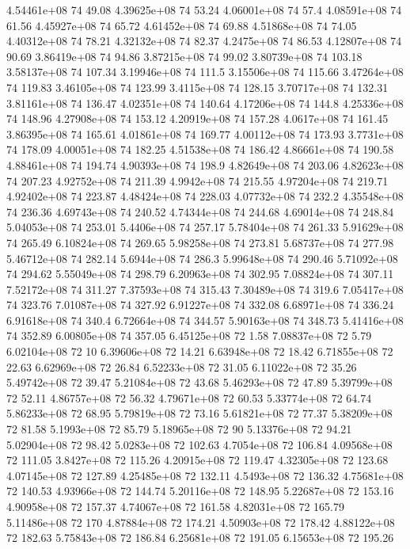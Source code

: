 4.54461e+08 74 49.08
4.39625e+08 74 53.24
4.06001e+08 74 57.4
4.08591e+08 74 61.56
4.45927e+08 74 65.72
4.61452e+08 74 69.88
4.51868e+08 74 74.05
4.40312e+08 74 78.21
4.32132e+08 74 82.37
4.2475e+08 74 86.53
4.12807e+08 74 90.69
3.86419e+08 74 94.86
3.87215e+08 74 99.02
3.80739e+08 74 103.18
3.58137e+08 74 107.34
3.19946e+08 74 111.5
3.15506e+08 74 115.66
3.47264e+08 74 119.83
3.46105e+08 74 123.99
3.4115e+08 74 128.15
3.70717e+08 74 132.31
3.81161e+08 74 136.47
4.02351e+08 74 140.64
4.17206e+08 74 144.8
4.25336e+08 74 148.96
4.27908e+08 74 153.12
4.20919e+08 74 157.28
4.0617e+08 74 161.45
3.86395e+08 74 165.61
4.01861e+08 74 169.77
4.00112e+08 74 173.93
3.7731e+08 74 178.09
4.00051e+08 74 182.25
4.51538e+08 74 186.42
4.86661e+08 74 190.58
4.88461e+08 74 194.74
4.90393e+08 74 198.9
4.82649e+08 74 203.06
4.82623e+08 74 207.23
4.92752e+08 74 211.39
4.9942e+08 74 215.55
4.97204e+08 74 219.71
4.92402e+08 74 223.87
4.48424e+08 74 228.03
4.07732e+08 74 232.2
4.35548e+08 74 236.36
4.69743e+08 74 240.52
4.74344e+08 74 244.68
4.69014e+08 74 248.84
5.04053e+08 74 253.01
5.4406e+08 74 257.17
5.78404e+08 74 261.33
5.91629e+08 74 265.49
6.10824e+08 74 269.65
5.98258e+08 74 273.81
5.68737e+08 74 277.98
5.46712e+08 74 282.14
5.6944e+08 74 286.3
5.99648e+08 74 290.46
5.71092e+08 74 294.62
5.55049e+08 74 298.79
6.20963e+08 74 302.95
7.08824e+08 74 307.11
7.52172e+08 74 311.27
7.37593e+08 74 315.43
7.30489e+08 74 319.6
7.05417e+08 74 323.76
7.01087e+08 74 327.92
6.91227e+08 74 332.08
6.68971e+08 74 336.24
6.91618e+08 74 340.4
6.72664e+08 74 344.57
5.90163e+08 74 348.73
5.41416e+08 74 352.89
6.00805e+08 74 357.05
6.45125e+08 72 1.58
7.08837e+08 72 5.79
6.02104e+08 72 10
6.39606e+08 72 14.21
6.63948e+08 72 18.42
6.71855e+08 72 22.63
6.62969e+08 72 26.84
6.52233e+08 72 31.05
6.11022e+08 72 35.26
5.49742e+08 72 39.47
5.21084e+08 72 43.68
5.46293e+08 72 47.89
5.39799e+08 72 52.11
4.86757e+08 72 56.32
4.79671e+08 72 60.53
5.33774e+08 72 64.74
5.86233e+08 72 68.95
5.79819e+08 72 73.16
5.61821e+08 72 77.37
5.38209e+08 72 81.58
5.1993e+08 72 85.79
5.18965e+08 72 90
5.13376e+08 72 94.21
5.02904e+08 72 98.42
5.0283e+08 72 102.63
4.7054e+08 72 106.84
4.09568e+08 72 111.05
3.8427e+08 72 115.26
4.20915e+08 72 119.47
4.32305e+08 72 123.68
4.07145e+08 72 127.89
4.25485e+08 72 132.11
4.5493e+08 72 136.32
4.75681e+08 72 140.53
4.93966e+08 72 144.74
5.20116e+08 72 148.95
5.22687e+08 72 153.16
4.90958e+08 72 157.37
4.74067e+08 72 161.58
4.82031e+08 72 165.79
5.11486e+08 72 170
4.87884e+08 72 174.21
4.50903e+08 72 178.42
4.88122e+08 72 182.63
5.75843e+08 72 186.84
6.25681e+08 72 191.05
6.15653e+08 72 195.26
